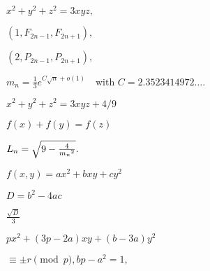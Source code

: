 \documentclass[14pt]{amsart}
\begin{document}
$ x^{2}+y^{2}+z^{2}=3xyz,\,$

$ (1,F_{2n-1},F_{2n+1}),\,$

$ (2,P_{2n-1},P_{2n+1}),\,$

$ m_{n}={\frac {1}{3}}e^{C{\sqrt {n}}+o(1)}\quad {\text{with } } C=2.3523414972\ldots .$

$ x^{2}+y^{2}+z^{2}=3xyz+4/9$

$ f(x)+f(y)=f(z)$

$ L_{n}={\sqrt {9-{4 \over {m_{n}}^{2}}}}.\,$

$ f(x,y)=ax^{2}+bxy+cy^{2}$

$ D=b^{2}-4ac$

$ {\frac {\sqrt {D}}{3}}$

$ px^{2}+(3p-2a)xy+(b-3a)y^{2}$

$ \equiv \pm r{\pmod {p}},bp-a^{2}=1,$
\end{document}
